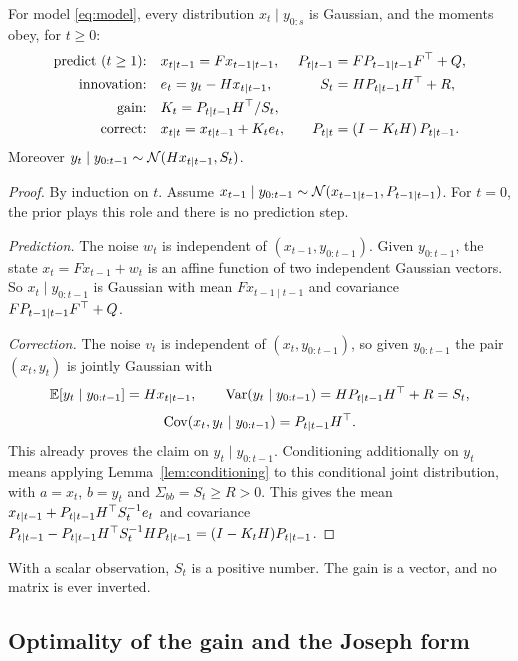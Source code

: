 \documentclass[11pt,a4paper]{article}
\begin{document}
\begin{theorem}\label{thm:kalman}
For model \eqref{eq:model}, every distribution $x_t\mid y_{0:s}$ is Gaussian, and the
moments obey, for $t\ge 0$:
\begin{align}
  \text{predict ($t\ge1$):}\quad & x_{t\mid t-1} = F x_{t-1\mid t-1}, &
     P_{t\mid t-1} &= F P_{t-1\mid t-1} F^\top + Q, \label{eq:predict}\\
  \text{innovation:}\quad & e_t = y_t - H x_{t\mid t-1}, &
     S_t &= H P_{t\mid t-1} H^\top + R, \label{eq:innovation}\\
  \text{gain:}\quad & K_t = P_{t\mid t-1} H^\top / S_t, \label{eq:gain}\\
  \text{correct:}\quad & x_{t\mid t} = x_{t\mid t-1} + K_t e_t, &
     P_{t\mid t} &= (I-K_tH)\,P_{t\mid t-1}. \label{eq:correct}
\end{align}
Moreover $y_t\mid y_{0:t-1}\sim\mathcal{N}(Hx_{t\mid t-1},S_t)$.
\end{theorem}
\begin{proof}
By induction on $t$. Assume $x_{t-1}\mid y_{0:t-1}\sim\mathcal{N}(x_{t-1\mid t-1},P_{t-1\mid t-1})$.
For $t=0$, the prior plays this role and there is no prediction step.

\emph{Prediction.} The noise $w_t$ is independent of $(x_{t-1},y_{0:t-1})$. Given
$y_{0:t-1}$, the state $x_t=Fx_{t-1}+w_t$ is an affine function of two
independent Gaussian vectors. So $x_t\mid y_{0:t-1}$ is Gaussian with mean
$Fx_{t-1\mid t-1}$ and covariance $FP_{t-1\mid t-1}F^\top+Q$.

\emph{Correction.} The noise $v_t$ is independent of $(x_t,y_{0:t-1})$, so given
$y_{0:t-1}$ the pair $(x_t,y_t)$ is jointly Gaussian with
\[
  \mathbb{E}[y_t\mid y_{0:t-1}] = Hx_{t\mid t-1},\qquad
  \operatorname{Var}(y_t\mid y_{0:t-1}) = HP_{t\mid t-1}H^\top+R = S_t,
\]
\[
  \operatorname{Cov}(x_t,y_t\mid y_{0:t-1}) = P_{t\mid t-1}H^\top .
\]
This already proves the claim on $y_t\mid y_{0:t-1}$. Conditioning
additionally on $y_t$ means applying Lemma~\ref{lem:conditioning} to this
conditional joint distribution, with $a=x_t$, $b=y_t$ and $\Sigma_{bb}=S_t\ge R>0$.
This gives the mean $x_{t\mid t-1}+P_{t\mid t-1}H^\top S_t^{-1}e_t$ and covariance
$P_{t\mid t-1}-P_{t\mid t-1}H^\top S_t^{-1}HP_{t\mid t-1}=(I-K_tH)P_{t\mid t-1}$.
\end{proof}

With a scalar observation, $S_t$ is a positive number. The gain is a vector,
and no matrix is ever inverted.

\subsection{Optimality of the gain and the Joseph form}
\end{document}
